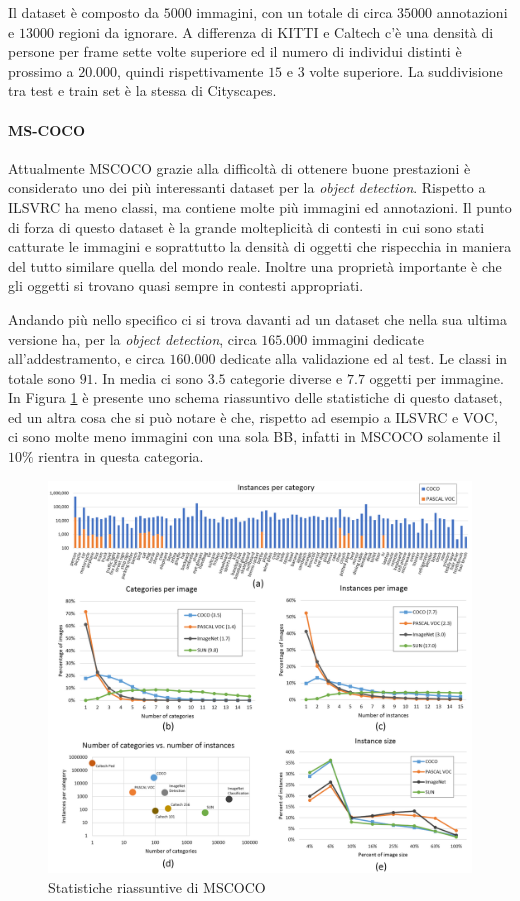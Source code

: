 Il dataset è composto da $5000$ immagini, con un totale di circa $35000$ annotazioni e $13000$ regioni da ignorare. A differenza di KITTI e Caltech c'è una densità di persone per frame sette volte superiore ed il numero di individui distinti è prossimo a $20.000$, quindi rispettivamente $15$ e $3$ volte superiore.  La suddivisione tra test e train set è la stessa di Cityscapes. 
\paragraph{MS-COCO} \cite{lin2014microsoft}
Attualmente \ac{MSCOCO} grazie alla difficoltà di ottenere buone prestazioni è considerato uno dei più interessanti dataset per la \textit{object detection}. Rispetto a \ac{ILSVRC} ha meno classi, ma contiene molte più immagini ed annotazioni. Il punto di forza di questo dataset è la grande molteplicità di contesti in cui sono stati catturate le immagini e soprattutto la densità di oggetti che rispecchia in maniera del tutto similare quella del mondo reale. Inoltre una proprietà importante è che gli oggetti si trovano quasi sempre in contesti appropriati.

Andando più nello specifico ci si trova davanti ad un dataset che nella sua ultima versione ha, per la \textit{object detection}, circa $165.000$ immagini dedicate all'addestramento, e circa $160.000$ dedicate alla validazione ed al test. Le classi in totale sono $91$. In media ci sono $3.5$ categorie diverse e $7.7$ oggetti per immagine. In Figura \ref{fig:dataanalysis_coco} è presente uno schema riassuntivo delle statistiche di questo dataset, ed un altra cosa che si può notare è che, rispetto ad esempio a \ac{ILSVRC} e \ac{VOC}, ci sono molte meno immagini con una sola \ac{BB}, infatti in \ac{MSCOCO} solamente il $10\%$ rientra in questa categoria.
\begin{figure}
    \centering
    \includegraphics[width=\textwidth]{images/dataanalysis.png}
    \caption{Statistiche riassuntive di \ac{MSCOCO} \cite{lin2014microsoft}}
    \label{fig:dataanalysis_coco}
\end{figure}
